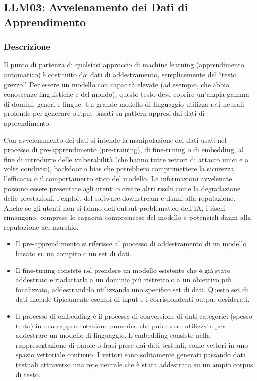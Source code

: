 \documentclass[
]{article}
\author{}
\date{}
\providecommand{\tightlist}{%
  \setlength{\itemsep}{0pt}\setlength{\parskip}{0pt}}
\begin{document}
\subsection{LLM03: Avvelenamento dei Dati di
Apprendimento}\label{llm03-avvelenamento-dei-dati-di-apprendimento}

\subsubsection{Descrizione}\label{descrizione}

Il punto di partenza di qualsiasi approccio di machine learning
(apprendimento automatico) è costituito dai dati di addestramento,
semplicemente del ``testo grezzo''. Per essere un modello con capacità
elevate (ad esempio, che abbia conoscenze linguistiche e del mondo),
questo testo deve coprire un'ampia gamma di domini, generi e lingue. Un
grande modello di linguaggio utilizza reti neurali profonde per generare
output basati su pattern appresi dai dati di apprendimento.

Con avvelenamento dei dati si intende la manipolazione dei dati usati
nel processo di pre-apprendimento (pre-training), di fine-tuning o di
embedding, al fine di introdurre delle vulnerabilità (che hanno tutte
vettori di attacco unici e a volte condivisi), backdoor o bias che
potrebbero compromettere la sicurezza, l'efficacia o il comportamento
etico del modello. Le informazioni avvelenate possono essere presentate
agli utenti o creare altri rischi come la degradazione delle
prestazioni, l'exploit del software downstream e danni alla reputazione.
Anche se gli utenti non si fidano dell'output problematico dell'IA, i
rischi rimangono, comprese le capacità compromesse del modello e
potenziali danni alla reputazione del marchio.

\begin{itemize}
\tightlist
\item
  Il pre-apprendimento si riferisce al processo di addestramento di un
  modello basato su un compito o un set di dati.
\item
  Il fine-tuning consiste nel prendere un modello esistente che è già
  stato addestrato e riadattarlo a un dominio più ristretto o a un
  obiettivo più focalizzato, addestrandolo utilizzando uno specifico set
  di dati. Questo set di dati include tipicamente esempi di input e i
  corrispondenti output desiderati.
\item
  Il processo di embedding è il processo di conversione di dati
  categorici (spesso testo) in una rappresentazione numerica che può
  essere utilizzata per addestrare un modello di linguaggio. L'embedding
  consiste nella rappresentazione di parole o frasi prese dai dati
  testuali, come vettori in uno spazio vettoriale continuo. I vettori
  sono solitamente generati passando dati testuali attraverso una rete
  neurale che è stata addestrata su un ampio corpus di testo.
\end{itemize}
\end{document}
